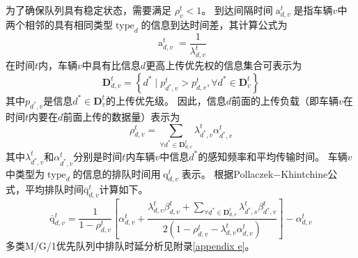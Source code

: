 为了确保队列具有稳定状态，需要满足 $\rho_{v}^{t} < 1$。
到达间隔时间$\operatorname{a}_{d, v}^t$是指车辆$v$中两个相邻的具有相同类型$\operatorname{type}_d$的信息到达时间差，其计算公式为  
\begin{equation}
    \operatorname{a}_{d, v}^t=\frac{1}{\lambda_{d, v}^{t}}
\end{equation}
在时间$t$内，车辆$v$中具有比信息$d$更高上传优先权的信息集合可表示为
\begin{equation}
\mathbf{D}_{d, v}^t=\left\{d^* \mid p_{d^*, v}^t>p_{d, v}^t, \forall d^* \in \mathbf{D}_v^t\right\} 
\end{equation}
其中$p_{d^*, v}$是信息$d^* \in \mathbf{D}_v^t$的上传优先级。
  因此，信息$d$前面的上传负载（即车辆$v$在时间$t$内要在$d$前面上传的数据量）表示为
\begin{equation}
\rho_{d, v}^t=\sum_{\forall d^* \in \mathbf{D}_{d, v}^t} \lambda_{d^*, v}^t \alpha_{d^*, v}^t
\end{equation}
其中$\lambda_{d^*, v}^t$和$\alpha_{d^*, v}^t$分别是时间$t$内车辆$v$中信息$d^*$的感知频率和平均传输时间。
车辆$v$中类型为$\operatorname{type}_d$的信息的排队时间用$\operatorname{q}_{d, v}^t$表示。
根据Pollaczek$-$Khintchine公式\cite{takine2001queue}，平均排队时间$\operatorname{\bar{q}}_{d, v}^t$计算如下。
\begin{equation}
    \operatorname{\bar{q}}_{d, v}^t= \frac{1} {1 - \rho_{d, v}^{t}} 
        \left[ \alpha_{d, v}^t + \frac{ \lambda_{d, v}^{t} \beta_{d, v}^t + \sum\limits_{\forall d^* \in \mathbf{D}_{d, v}^t} \lambda_{d^*,s}^t \beta_{d^*, v}^t }{2\left(1-\rho_{d, v}^{t} - \lambda_{d, v}^{t}  \alpha_{d, v}^t\right)}\right] 
        - \alpha_{d, v}^t
\label{equ 3-6}
\end{equation}
多类M/G/1优先队列中排队时延分析见附录\ref{appendix e}。

